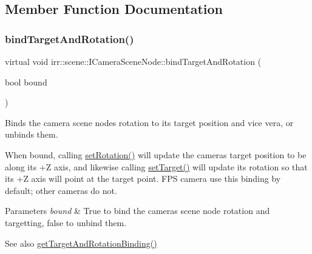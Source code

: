 \subsection{Member Function Documentation}
\mbox{\label{classirr_1_1scene_1_1ICameraSceneNode_ad8785d7b2f730933a8d4425ac54e7205}} 
\subsubsection{\texorpdfstring{bind\+Target\+And\+Rotation()}{bindTargetAndRotation()}}
{\footnotesize\ttfamily virtual void irr\+::scene\+::\+I\+Camera\+Scene\+Node\+::bind\+Target\+And\+Rotation (\begin{DoxyParamCaption}\item[{bool}]{bound }\end{DoxyParamCaption})\hspace{0.3cm}{\ttfamily [pure virtual]}}



Binds the camera scene node\textquotesingle{}s rotation to its target position and vice vera, or unbinds them. 

When bound, calling \hyperlink{classirr_1_1scene_1_1ICameraSceneNode_af95d5f50c192f212e11f3f050e92a470}{set\+Rotation()} will update the camera\textquotesingle{}s target position to be along its +Z axis, and likewise calling \hyperlink{classirr_1_1scene_1_1ICameraSceneNode_a7280b07fd7915c64350db5a132b4ba07}{set\+Target()} will update its rotation so that its +Z axis will point at the target point. F\+PS camera use this binding by default; other cameras do not. 
\begin{DoxyParams}{Parameters}
{\em bound} & True to bind the camera\textquotesingle{}s scene node rotation and targetting, false to unbind them. \\
\hline
\end{DoxyParams}
\begin{DoxySeeAlso}{See also}
\hyperlink{classirr_1_1scene_1_1ICameraSceneNode_a343be24b2c43db7580127229db2dec6a}{get\+Target\+And\+Rotation\+Binding()} 
\end{DoxySeeAlso}
\mbox{\label{classirr_1_1scene_1_1ICameraSceneNode_aed7af13bc5a076d61a10a1998f71742e}} 
